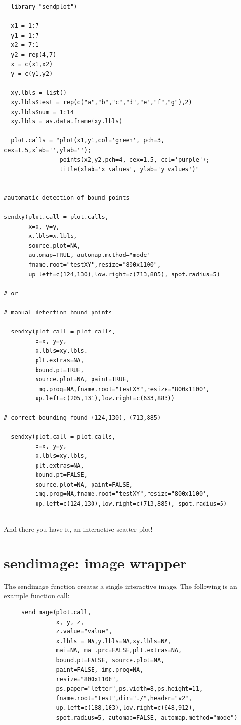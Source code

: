 \documentclass[]{article}
\begin{document}
\begin{verbatim}
  library("sendplot")
	 
  x1 = 1:7
  y1 = 1:7    
  x2 = 7:1
  y2 = rep(4,7)
  x = c(x1,x2)
  y = c(y1,y2)

  xy.lbls = list()
  xy.lbls$test = rep(c("a","b","c","d","e","f","g"),2)
  xy.lbls$num = 1:14
  xy.lbls = as.data.frame(xy.lbls)
	    
  plot.calls = "plot(x1,y1,col='green', pch=3, cex=1.5,xlab='',ylab='');
                points(x2,y2,pch=4, cex=1.5, col='purple');
                title(xlab='x values', ylab='y values')"
   

#automatic detection of bound points

sendxy(plot.call = plot.calls, 
       x=x, y=y,
       x.lbls=x.lbls,  
       source.plot=NA, 
       automap=TRUE, automap.method="mode"
       fname.root="testXY",resize="800x1100", 
       up.left=c(124,130),low.right=c(713,885), spot.radius=5)

# or 

# manual detection bound points

  sendxy(plot.call = plot.calls, 
         x=x, y=y,
         x.lbls=xy.lbls, 
         plt.extras=NA,
         bound.pt=TRUE, 
         source.plot=NA, paint=TRUE,
         img.prog=NA,fname.root="testXY",resize="800x1100",
         up.left=c(205,131),low.right=c(633,883))

# correct bounding found (124,130), (713,885)

  sendxy(plot.call = plot.calls, 
         x=x, y=y,
         x.lbls=xy.lbls, 
         plt.extras=NA,
         bound.pt=FALSE, 
         source.plot=NA, paint=FALSE,
         img.prog=NA,fname.root="testXY",resize="800x1100",
         up.left=c(124,130),low.right=c(713,885), spot.radius=5)
 
\end{verbatim}


And there you have it, an interactive scatter-plot! 

\newpage



\section{sendimage: image wrapper}

The sendimage function creates a single interactive image. The following is an example function call: 

\begin{verbatim}
     sendimage(plot.call,
               x, y, z,
               z.value="value",
               x.lbls = NA,y.lbls=NA,xy.lbls=NA,
               mai=NA, mai.prc=FALSE,plt.extras=NA,
               bound.pt=FALSE, source.plot=NA,
               paint=FALSE, img.prog=NA,
               resize="800x1100",
               ps.paper="letter",ps.width=8,ps.height=11,
               fname.root="test",dir="./",header="v2",
               up.left=c(188,103),low.right=c(648,912),
               spot.radius=5, automap=FALSE, automap.method="mode")
\end{verbatim}
\end{document}
